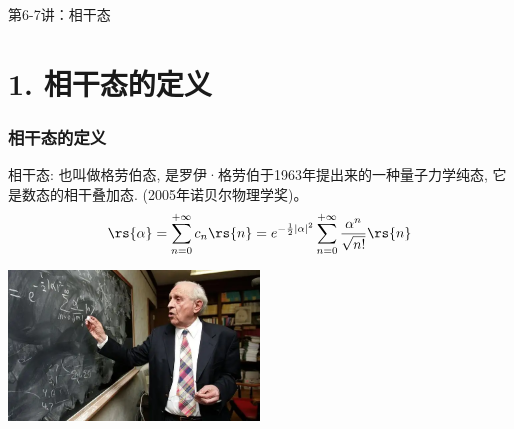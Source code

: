 
\begin{frame} [plain]
    \frametitle{}
    \Background[1] 
    \begin{center}
    {\huge 第6-7讲：相干态}
    \end{center}  
    \addtocounter{framenumber}{-1}   
\end{frame}

\section{1. 相干态的定义}

\begin{frame}
 \frametitle{相干态的定义}
 相干态: 也叫做格劳伯态, 是罗伊·格劳伯于1963年提出来的一种量子力学纯态, 它是数态的相干叠加态. (2005年诺贝尔物理学奖)。
 \[ \rs{\alpha} = \sum_{n=0} ^{+\infty} c_n  \rs{n} = e^{-\frac{1}{2}\left|\alpha\right|^2}  \sum_{n=0} ^{+\infty}  \frac{\alpha^n}{\sqrt{n!}} \rs{n} \]
   \begin{center}
        \includegraphics[width=0.5\textwidth]{figs/2022-04-27-11-50-32.png}
   \end{center}
\end{frame}



